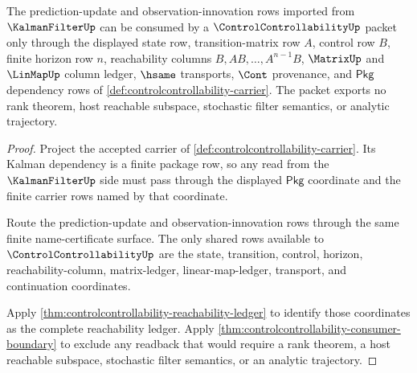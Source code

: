 \begin{theorem}
\label{thm:controlcontrollability-kalman-reachability-source}
The prediction-update and observation-innovation rows imported from $\KalmanFilterUp$ can be consumed by a $\ControlControllabilityUp$ packet only through the displayed state row, transition-matrix row $A$, control row $B$, finite horizon row $n$, reachability columns $B,AB,\ldots,A^{n-1}B$, $\MatrixUp$ and $\LinMapUp$ column ledger, $\hsame$ transports, $\Cont$ provenance, and $\mathsf{Pkg}$ dependency rows of \autoref{def:controlcontrollability-carrier}. The packet exports no rank theorem, host reachable subspace, stochastic filter semantics, or analytic trajectory.
\end{theorem}
\begin{proof}
Project the accepted carrier of \autoref{def:controlcontrollability-carrier}. Its Kalman dependency is a finite package row, so any read from the $\KalmanFilterUp$ side must pass through the displayed $\mathsf{Pkg}$ coordinate and the finite carrier rows named by that coordinate.

Route the prediction-update and observation-innovation rows through the same finite name-certificate surface. The only shared rows available to $\ControlControllabilityUp$ are the state, transition, control, horizon, reachability-column, matrix-ledger, linear-map-ledger, transport, and continuation coordinates.

Apply \autoref{thm:controlcontrollability-reachability-ledger} to identify those coordinates as the complete reachability ledger. Apply \autoref{thm:controlcontrollability-consumer-boundary} to exclude any readback that would require a rank theorem, a host reachable subspace, stochastic filter semantics, or an analytic trajectory.
\end{proof}

